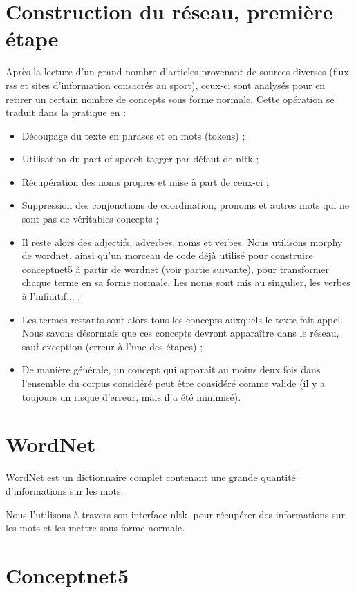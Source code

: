 \documentclass[a4paper,12pt]{article}
\begin{document}
\section{Construction du réseau, première étape}

Après la lecture d'un grand nombre d'articles provenant de sources diverses (flux rss et sites d'information consacrés au sport), ceux-ci sont analysés pour en retirer un certain nombre de concepts sous forme normale. Cette opération se traduit dans la pratique en :
\begin{itemize}
 \item Découpage du texte en phrases et en mots (tokens) ;
 \item Utilisation du part-of-speech tagger par défaut de nltk ;
 \item Récupération des noms propres et mise à part de ceux-ci ;
 \item Suppression des conjonctions de coordination, pronoms et autres mots qui ne sont pas de véritables concepts ;
 \item Il reste alors des adjectifs, adverbes, noms et verbes. Nous utilisons morphy de wordnet, ainsi qu'un morceau de code déjà utilisé pour construire conceptnet5 à partir de wordnet (voir partie suivante), pour transformer chaque terme en sa forme normale. Les noms sont mis au singulier, les verbes à l'infinitif... ;
 \item Les termes restants sont alors tous les concepts auxquels le texte fait appel. Nous savons désormais que ces concepts devront apparaître dans le réseau, sauf exception (erreur à l'une des étapes) ;
 \item De manière générale, un concept qui apparaît au moins deux fois dans l'ensemble du corpus considéré peut être considéré comme valide (il y a toujours un risque d'erreur, mais il a été minimisé).
\end{itemize}


\section{WordNet}

WordNet est un dictionnaire complet contenant une grande quantité d'informations sur les mots.

Nous l'utilisons à travers son interface nltk, pour récupérer des informations sur les mots et les mettre sous forme normale.


\section{Conceptnet5}
\end{document}
